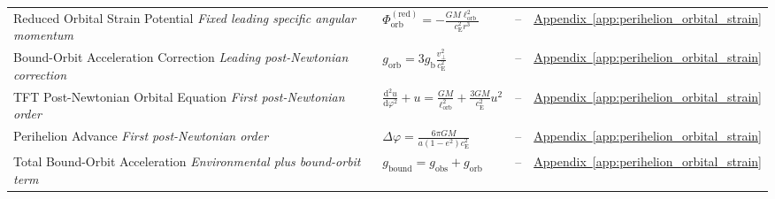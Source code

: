 \begin{longtable}{@{} p{4.5cm} p{6cm} c p{4cm} @{}}
{\raggedright Reduced Orbital Strain Potential \newline \textit{Fixed leading specific angular momentum}\par} & {\raggedright $\Phi_{\mathrm{orb}}^{(\mathrm{red})} = - \frac{GM\ell_{\mathrm{orb}}^2}{c_{\mathrm{E}}^2r^3}$\par} & -- & {\raggedright \hyperref[app:perihelion_orbital_strain]{Appendix~\ref*{app:perihelion_orbital_strain}}\par} \\

{\raggedright Bound-Orbit Acceleration Correction \newline \textit{Leading post-Newtonian correction}\par} & {\raggedright $g_{\mathrm{orb}} = 3g_{\mathrm{b}} \frac{v_\perp^2}{c_{\mathrm{E}}^2}$\par} & -- & {\raggedright \hyperref[app:perihelion_orbital_strain]{Appendix~\ref*{app:perihelion_orbital_strain}}\par} \\

{\raggedright TFT Post-Newtonian Orbital Equation \newline \textit{First post-Newtonian order}\par} & {\raggedright $\frac{\mathrm{d}^2u}{\mathrm{d}\varphi^2} + u = \frac{GM}{\ell_{\mathrm{orb}}^2} + \frac{3GM}{c_{\mathrm{E}}^2}u^2$\par} & -- & {\raggedright \hyperref[app:perihelion_orbital_strain]{Appendix~\ref*{app:perihelion_orbital_strain}}\par} \\

{\raggedright Perihelion Advance \newline \textit{First post-Newtonian order}\par} & {\raggedright $\Delta\varphi = \frac{6\pi GM}{a(1-e^2)c_{\mathrm{E}}^2}$\par} & -- & {\raggedright \hyperref[app:perihelion_orbital_strain]{Appendix~\ref*{app:perihelion_orbital_strain}}\par} \\

{\raggedright Total Bound-Orbit Acceleration \newline \textit{Environmental plus bound-orbit term}\par} & {\raggedright $g_{\mathrm{bound}}=g_{\mathrm{obs}}+g_{\mathrm{orb}}$\par} & -- & {\raggedright \hyperref[app:perihelion_orbital_strain]{Appendix~\ref*{app:perihelion_orbital_strain}}\par} \\

\bottomrule
\end{longtable}

